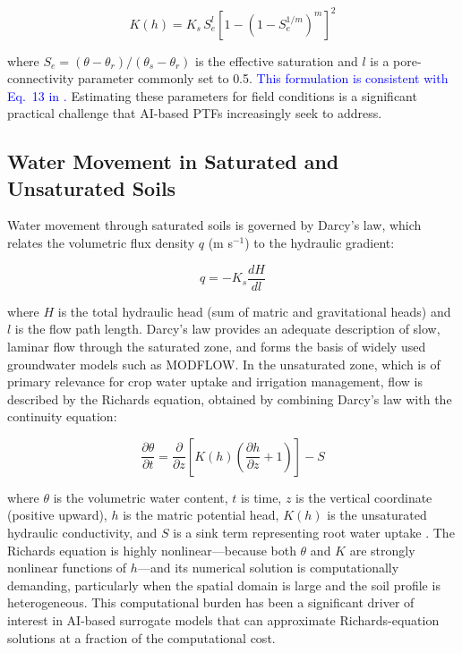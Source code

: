 \documentclass[land,article,submit,pdftex,moreauthors]{Definitions/mdpi}
\numberwithin{equation}{section}
\begin{document}
\begin{equation}
K(h) = K_s \, S_e^{l} \left[1 - \left(1 - S_e^{1/m}\right)^{m}\right]^2
\end{equation}

\noindent where $S_e = (\theta - \theta_r)/(\theta_s - \theta_r)$ is the effective saturation and $l$ is a pore-connectivity parameter commonly set to 0.5. \textcolor{blue}{This formulation is consistent with Eq.~13 in \citet{simunek2008hydrus}.} Estimating these parameters for field conditions is a significant practical challenge that AI-based PTFs increasingly seek to address.

\subsection{Water Movement in Saturated and Unsaturated Soils}

Water movement through saturated soils is governed by Darcy's law, which relates the volumetric flux density $q$ (m s$^{-1}$) to the hydraulic gradient:

\begin{equation}
q = -K_s \frac{dH}{dl}
\end{equation}

\noindent where $H$ is the total hydraulic head (sum of matric and gravitational heads) and $l$ is the flow path length. Darcy's law provides an adequate description of slow, laminar flow through the saturated zone, and forms the basis of widely used groundwater models such as MODFLOW. In the unsaturated zone, which is of primary relevance for crop water uptake and irrigation management, flow is described by the Richards equation, obtained by combining Darcy's law with the continuity equation:

\begin{equation}
\frac{\partial \theta}{\partial t} = \frac{\partial}{\partial z}\left[K(h)\left(\frac{\partial h}{\partial z} + 1\right)\right] - S
\end{equation}

\noindent where $\theta$ is the volumetric water content, $t$ is time, $z$ is the vertical coordinate (positive upward), $h$ is the matric potential head, $K(h)$ is the unsaturated hydraulic conductivity, and $S$ is a sink term representing root water uptake \citep{richards1931capillary}. The Richards equation is highly nonlinear---because both $\theta$ and $K$ are strongly nonlinear functions of $h$---and its numerical solution is computationally demanding, particularly when the spatial domain is large and the soil profile is heterogeneous. This computational burden has been a significant driver of interest in AI-based surrogate models that can approximate Richards-equation solutions at a fraction of the computational cost.
\end{document}
